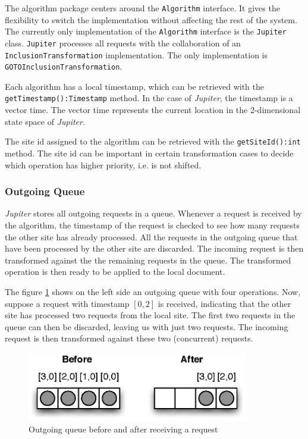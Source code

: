 The algorithm package centers around the \texttt{Algorithm} interface.
It gives the flexibility to switch the implementation without affecting the 
rest of the system. The currently only implementation of the \texttt{Algorithm} 
interface is the \texttt{Jupiter} class. \texttt{Jupiter} processes 
all requests with the collaboration of an \texttt{InclusionTransformation}
implementation. The only implementation is \texttt{GOTOInclusionTransformation}.

Each algorithm has a local timestamp, which can be retrieved with the
\texttt{getTimestamp():Timestamp} method. In the 
case of \emph{Jupiter}, the timestamp is a vector time. The vector 
time represents the current location in the 2-dimensional state space of 
\emph{Jupiter}. 

The site id assigned to the algorithm can be retrieved with the
\texttt{getSiteId():int} method. The site id can be important in certain
transformation cases to decide which operation has higher priority, i.e.
is not shifted.

\subsubsection{Outgoing Queue}
\label{sect:algorithm.outgoingqueue}
\emph{Jupiter} stores all outgoing requests in a queue. Whenever a request
is received by the algorithm, the timestamp of the request is checked to
see how many requests the other site has already processed. All the requests
in the outgoing queue that have been processed by the other site are discarded.
The incoming request is then transformed against the the remaining requests
in the queue. The transformed operation is then ready to be applied to the
local document.

The figure \ref{fig:algorithm.outqueue} shows on the left side an outgoing
queue with four operations. Now, suppose a request with timestamp $[0,2]$
is received, indicating that the other site has processed two requests
from the local site. The first two requests in the queue can then be
discarded, leaving us with just two requests. The incoming request is then
transformed against these two (concurrent) requests.

\begin{figure}[H]
\centering
\includegraphics[height=3.03cm,width=9.67cm]{../images/finalreport/algorithm_outqueue.eps}
\caption{Outgoing queue before and after receiving a request}
\label{fig:algorithm.outqueue}
\end{figure}

